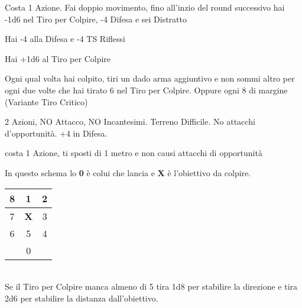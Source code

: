 \documentclass[landscape,10pt,a4paper]{article}
\begin{document}
\begin{multicols}{3}
\begin{dmbox}[title=Azione di Scatto]	
Costa 1 Azione. Fai doppio movimento, fino all'inzio del round successivo hai -1d6 nel Tiro per Colpire, -4 Difesa e sei Distratto
\end{dmbox}	

\begin{dmbox}[title=Difesa da Sorpresi]	
Hai -4 alla Difesa e -4 TS Riflessi
\end{dmbox}	

\begin{dmbox}[title=Attacco a Tocco]	
Hai +1d6 al Tiro per Colpire
\end{dmbox}		

\begin{dmbox}[title=Tiro Critico]	
Ogni qual volta hai colpito, tiri un dado arma aggiuntivo e non sommi altro per ogni due volte che hai tirato 6 nel Tiro per Colpire. Oppure ogni 8 di margine (Variante Tiro Critico)
\end{dmbox}		

\begin{dmbox}[title=Difesa Totale]	
2 Azioni, NO Attacco, NO Incantesimi. Terreno Difficile. No attacchi d'opportunità. +4 in Difesa.
\end{dmbox}		

\begin{dmbox}[title=Disingaggiare]	
costa 1 Azione, ti sposti di 1 metro e non causi attacchi di opportunità
\end{dmbox}		
	
\begin{dmbox}[title=Armi a spargimento]	
In questo schema lo \textbf{0} è colui che lancia e \textbf{X} è l'obiettivo da colpire.\\
	
\noindent\begin{tabular}{c|c|c}
	8 &1 &2\\
	\hline
	7 &\textbf{X}& 3\\
	\hline
	6 &5& 4\\
	\hline
	&0&\\
\end{tabular}\\		

Se il Tiro per Colpire manca almeno di 5 tira 1d8 per stabilire la direzione e tira 2d6 per stabilire la distanza dall'obiettivo.
\end{dmbox}			
	
\begin{dmbox}[title=Visione]	
	

\end{dmbox}
\end{multicols}
\end{document}

